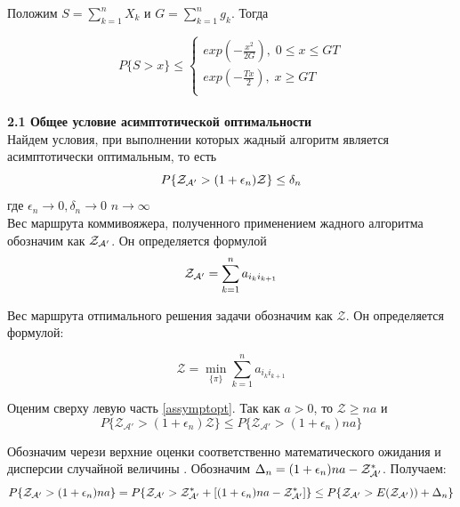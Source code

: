 \documentclass[a4paper, 14pt]{extarticle}
\begin{document}
Положим $S=\sum_{k=1}^{n} X_k $ и $G=\sum_{k=1}^{n} g_k $. Тогда

\begin{equation}
P\{S > x\} \leq 
\begin{cases}
   exp (-\frac{x^{2}}{2G}), \; 0 \leq x \leq GT\\
   exp (-\frac{Tx}{2}), \; x\geq GT \\
 \end{cases}
\end{equation}\\



\textbf{2.1 Общее условие асимптотической оптимальности}\\

Найдем условия, при выполнении которых жадный алгоритм является асимптотически оптимальным, то есть
\begin{equation}\label{assymptopt}
P\{\text{$\mathcal{Z_{A'}}$} > (1+\epsilon_n)\mathcal{Z}\}\leq \delta_n
\end{equation}
где $\epsilon_n \rightarrow 0, \delta_n \rightarrow 0$ $n \rightarrow \infty$\\

Вес маршрута коммивояжера, полученного применением жадного алгоритма обозначим как $\text{$\mathcal{Z_{A'}}$}$. Он определяется формулой
\begin{equation}
\text{$\mathcal{Z_{A'}}$} = \sum_{k=1}^n a_{i_k i_{k+1}}
\end{equation}

Вес маршрута отпимального решения задачи обозначим как $\mathcal{Z}$. Он определяется формулой:

\begin{equation}
\mathcal{Z} = \min_{\{ \pi \}} \sum_{k=1}^n a_{i_k i_{k+1}}
\end{equation}


Оценим сверху левую часть \eqref{assymptopt}. Так как $a>0$, то $\mathcal{Z} \geq na$ и 
\begin{equation}\label{4}
P\{\mathcal{Z_{A'}} > (1+\epsilon_n)\mathcal{Z}\}\leq P\{\mathcal{Z_{A'}} > (1+\epsilon_n)na\}
\end{equation}


Обозначим через\topboundE и \topboundD верхние оценки соответственно математического ожидания \randomvalueE и дисперсии \randomvalueD случайной величины \randomvalue . Обозначим $\Delta_n=(1+\epsilon_n)na-\text{$\mathcal{Z^*_{A'}}$}$. Получаем:
\begin{equation}\label{5}
P\{\text{$\mathcal{Z_{A'}}$} > (1+\epsilon_n)na\} = 
P\{\text{$\mathcal{Z_{A'}}$} > \text{$\mathcal{Z^*_{A'}}$}+[(1+\epsilon_n)na-\text{$\mathcal{Z^*_{A'}}$}]\} \leq
P\{\text{$\mathcal{Z_{A'}}$} > \text{$E(\text{$\mathcal{Z_{A'}}$})$})+ \Delta_n\}
\end{equation}
\end{document}
